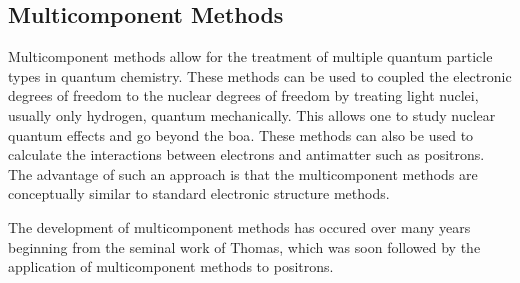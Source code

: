 \subsection{Multicomponent Methods}
Multicomponent methods allow for the treatment of multiple quantum particle types in quantum chemistry.
These methods can be used to coupled the electronic degrees of freedom to the nuclear degrees of freedom by treating light nuclei, usually only hydrogen, quantum mechanically.
This allows one to study nuclear quantum effects and go beyond the \gls{boa}.
These methods can also be used to calculate the interactions between electrons and antimatter such as positrons.
The advantage of such an approach is that the multicomponent methods are conceptually similar to standard electronic structure methods.

The development of multicomponent methods has occured over many years beginning from the seminal work of Thomas,\cite{10.1103/PhysRev.185.90, 10.1016/0009-26146987015-6, 10.1103/PhysRevA.2.1200,10.1103/PhysRevA.3.565} which was soon followed by the application of multicomponent methods to positrons.\cite{10.1088/0022-3700/11/16/001, 10.1088/0022-3700/12/15/007,10.1063/1.438933,10.1063/1.442211,10.1088/0022-3700/14/22/019}
